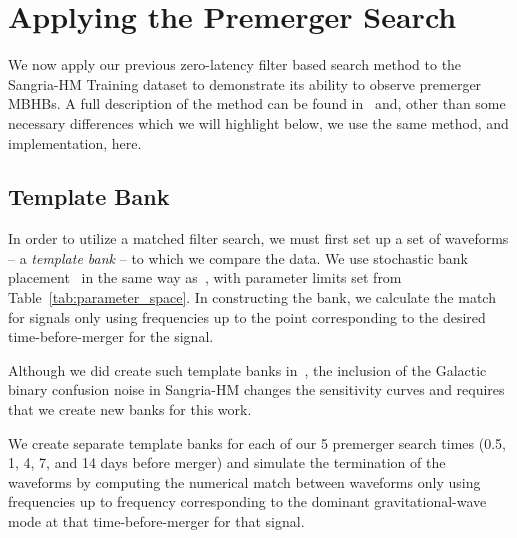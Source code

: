\section{Applying the Premerger Search}
\label{sec:zerolatency_sangria}

We now apply our previous zero-latency filter based search method to the Sangria-HM Training dataset to demonstrate its ability to observe premerger \acp{MBHB}.
A full description of the method can be found in~\cite{CabournDavies:2024hea} and, other than some necessary differences which we will highlight below, we use the same method, and implementation, here.

\subsection{Template Bank}
\label{subsec:template_bank}
In order to utilize a matched filter search, we must first set up a set of waveforms -- a \textit{template bank} -- to which
we compare the data.
We use stochastic bank placement~\cite{Babak:2008rb, Harry:2009ea} in the same way as~\cite{CabournDavies:2024hea},
with parameter limits set from Table~\ref{tab:parameter_space}.
In constructing the bank, we calculate the match for signals only using frequencies up to the point corresponding to the desired
time-before-merger for the signal.

Although we did create such template banks in~\cite{CabournDavies:2024hea}, the inclusion of the
Galactic binary confusion noise in Sangria-HM changes the sensitivity curves and requires that we create new banks for this work. 

We create separate template banks for each of our 5 premerger search times (0.5, 1, 4, 7, and 14 days before merger) and simulate the termination of the waveforms by computing the numerical
match between waveforms only using frequencies up to frequency corresponding to the dominant gravitational-wave mode at that time-before-merger for that signal. 


